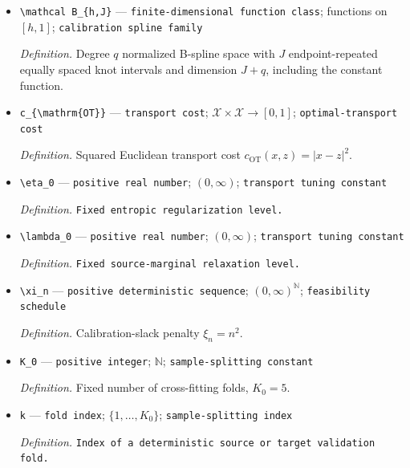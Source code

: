 \documentclass{article}
\begin{document}
\begin{itemize}
  \par\smallskip\noindent\emph{Definition.} Spline degree \(q=\lceil\max\{s,t\}\rceil\).
  \item \texttt{\textbackslash{}\allowbreak{}mathcal B\_\allowbreak{}\{h,\allowbreak{}J\}\allowbreak{}} --- \texttt{finite-\allowbreak{}dimensional function class}; functions on \([h,1]\); \texttt{calibration spline family}
  \par\smallskip\noindent\emph{Definition.} Degree \(q\) normalized B-spline space with \(J\) endpoint-repeated equally spaced knot intervals and dimension \(J+q\), including the constant function.
  \item \texttt{c\_\allowbreak{}\{\textbackslash{}\allowbreak{}mathrm\{OT\}\allowbreak{}\}\allowbreak{}} --- \texttt{transport cost}; \(\mathcal X\times\mathcal X\to[0,1]\); \texttt{optimal-\allowbreak{}transport cost}
  \par\smallskip\noindent\emph{Definition.} Squared Euclidean transport cost \(c_{\mathrm{OT}}(x,z)=|x-z|^2\).
  \item \texttt{\textbackslash{}\allowbreak{}eta\_\allowbreak{}0} --- \texttt{positive real number}; \((0,\infty)\); \texttt{transport tuning constant}
  \par\smallskip\noindent\emph{Definition.} \texttt{Fixed entropic regularization level.}
  \item \texttt{\textbackslash{}\allowbreak{}lambda\_\allowbreak{}0} --- \texttt{positive real number}; \((0,\infty)\); \texttt{transport tuning constant}
  \par\smallskip\noindent\emph{Definition.} \texttt{Fixed source-\allowbreak{}marginal relaxation level.}
  \item \texttt{\textbackslash{}\allowbreak{}xi\_\allowbreak{}n} --- \texttt{positive deterministic sequence}; \((0,\infty)^\mathbb N\); \texttt{feasibility schedule}
  \par\smallskip\noindent\emph{Definition.} Calibration-slack penalty \(\xi_n=n^2\).
  \item \texttt{K\_\allowbreak{}0} --- \texttt{positive integer}; \(\mathbb N\); \texttt{sample-\allowbreak{}splitting constant}
  \par\smallskip\noindent\emph{Definition.} Fixed number of cross-fitting folds, \(K_0=5\).
  \item \texttt{k} --- \texttt{fold index}; \(\{1,\ldots,K_0\}\); \texttt{sample-\allowbreak{}splitting index}
  \par\smallskip\noindent\emph{Definition.} \texttt{Index of a deterministic source or target validation fold.}

\end{itemize}
\end{document}
